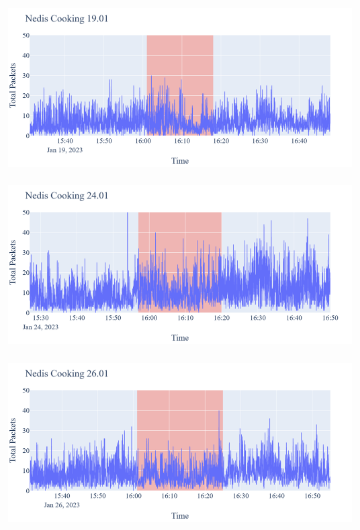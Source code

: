 \begin{figure}[H]
\begin{subfigure}[b]{0.5\textwidth}
    \end{subfigure}
    \begin{subfigure}[b]{0.5\textwidth}
        \centering
        \includegraphics[width=1.2\hsize]{figures/Nedis_Cooking_Packets_19.01.png}
    \end{subfigure}
    \begin{subfigure}[b]{0.5\textwidth}
        \centering
        \includegraphics[width=1.2\hsize]{figures/Nedis_Cooking_Packets_24.01.png}
    \end{subfigure}
    \begin{subfigure}[b]{0.5\textwidth}
        \centering
        \includegraphics[width=1.2\hsize]{figures/Nedis_Cooking_Packets_26.01.png}
    \end{subfigure}
    \begin{subfigure}[b]{0.5\textwidth}

\end{subfigure}
\end{figure}
